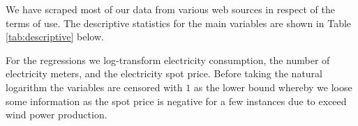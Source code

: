 \label{sec:data}
We have scraped most of our data from various web sources in respect of the terms of use. The descriptive statistics for the main variables are shown in Table \ref{tab:descriptive} below.
\par
For the regressions we log-transform electricity consumption, the number of electricity meters, and the electricity spot price. Before taking the natural logarithm the variables are censored with $1$ as the lower bound whereby we loose some information as the spot price is negative for a few instances due to exceed wind power production.

